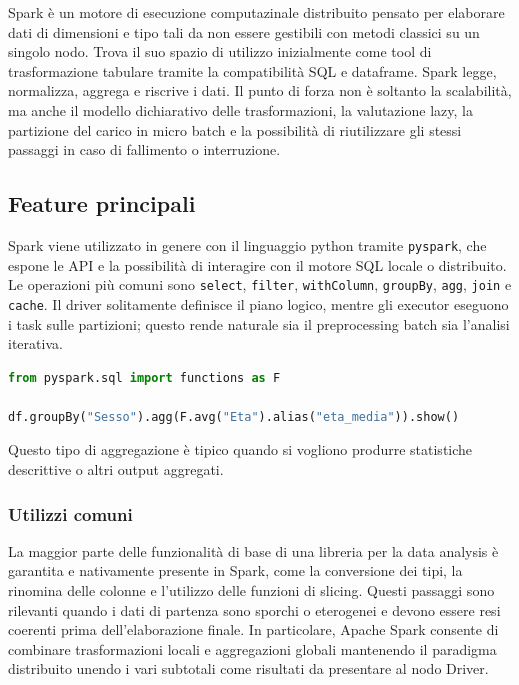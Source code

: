 \documentclass{article}
\begin{document}
Spark è un motore di esecuzione computazinale distribuito pensato per elaborare dati di dimensioni e tipo %
tali da non essere gestibili con metodi classici su un singolo nodo. %
Trova il suo spazio di utilizzo inizialmente come tool %
di trasformazione tabulare tramite la compatibilità SQL e dataframe. Spark %
legge, normalizza, aggrega e riscrive i dati. %
Il punto di forza non è soltanto la scalabilità, ma anche il modello dichiarativo %
delle trasformazioni, la valutazione lazy, la partizione del carico in micro batch %
e la possibilità di riutilizzare gli stessi passaggi in caso di fallimento o %
interruzione.

\subsection{Feature principali}
Spark viene utilizzato in genere con il linguaggio python tramite \texttt{pyspark}, %
che espone le API e la possibilità di interagire con il motore SQL locale o distribuito. %
Le operazioni più comuni sono \texttt{select}, \texttt{filter}, \texttt{withColumn}, %
\texttt{groupBy}, \texttt{agg}, \texttt{join} e \texttt{cache}. %
Il driver solitamente definisce il piano logico, mentre %
gli executor eseguono i task sulle partizioni; questo rende %
naturale sia il preprocessing batch sia l'analisi iterativa.

\begin{lstlisting}[language=Python]
from pyspark.sql import functions as F

df.groupBy("Sesso").agg(F.avg("Eta").alias("eta_media")).show()
\end{lstlisting}

Questo tipo di aggregazione è tipico quando si vogliono %
produrre statistiche descrittive o altri output aggregati.

\subsubsection{Utilizzi comuni}

La maggior parte delle funzionalità di base di una %
libreria per la data analysis è garantita e nativamente presente %
in Spark, come la conversione dei tipi, la rinomina delle colonne %
e l’utilizzo delle funzioni di slicing. Questi passaggi sono %
rilevanti quando i dati di partenza sono sporchi o eterogenei %
e devono essere resi coerenti prima dell’elaborazione %
finale. In particolare, Apache Spark consente di combinare %
trasformazioni locali e aggregazioni globali mantenendo %
il paradigma distribuito unendo i vari subtotali come risultati %
da presentare al nodo Driver.
\end{document}
